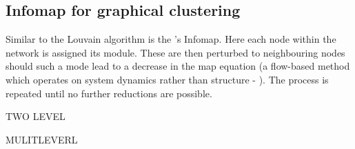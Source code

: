 \subsection{Infomap for graphical clustering }

Similar to the Louvain algorithm is the \cite{infomap}'s Infomap. Here each node within the network is assigned its module. These are then perturbed to neighbouring nodes should such a mode lead to a decrease in the map equation (a flow-based method which operates on system dynamics rather than structure - \citep{mapeqn}). The process is repeated until no further reductions are possible.

TWO LEVEL

MULITLEVERL


%

%




